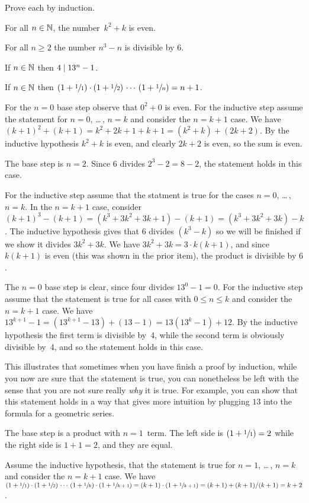 \documentclass{ibl}
\begin{document}
\begin{ex}
Prove each by induction.
\begin{exes}
\item For all $n\in\mathbb{N}$, the number~$k^2+k$ is even.
\item For all $n\geq 2$ the number $n^3-n$ is divisible by $6$.
\item If $n\in\mathbb{N}$ then $4\mid 13^n-1$.
\item If $n\in\mathbb{N}$ then
    $(1+\sfrac{1}{1})\cdot(1+\sfrac{1}{2})\,\cdots\,(1+\sfrac{1}{n})=n+1$.
\end{exes}
\begin{ans}
\begin{exes}
\item For the $n=0$ base step observe that $0^2+0$ is even.
  For the inductive step assume the statement for $n=0$, \ldots\,, $n=k$
  and consider the $n=k+1$ case.
  We have $(k+1)^2+(k+1)=k^2+2k+1+k+1=(k^2+k)+(2k+2)$. 
  By the inductive hypothesis $k^2+k$ is even, and clearly $2k+2$ is even, 
  so the sum is even.
\item The base step is $n=2$.
  Since $6$ divides $2^3-2=8-2$, the statement holds in this case.

  For the inductive step assume that the statment is true for 
  the cases $n=0$, \ldots\,, $n=k$.
  In the $n=k+1$ case, consider 
  $(k+1)^3-(k+1)=(k^3+3k^2+3k+1)-(k+1)=(k^3+3k^2+3k)-k$.
  The inductive hypothesis gives that $6$ divides $(k^3-k)$ so we will
  be finished if we show it divides  $3k^2+3k$.
  We have $3k^2+3k=3\cdot k(k+1)$, and since
  $k(k+1)$ is even (this was shown in the prior item),
  the product is divisible by $6$.  
\item The $n=0$ base step is clear, since four divides $13^0-1=0$.
  For the inductive step assume that the statement is true for all cases 
  with $0\leq n\leq k$ and consider the $n=k+1$ case.
  We have $13^{k+1}-1=(13^{k+1}-13)+(13-1)=13(13^k-1)+12$.
  By the inductive hypothesis the first term is divisible by~$4$, while the
  second term is obviously divisible by~$4$, and so the statement holds in 
  this case.

  \remark
  This illustrates that 
  sometimes when you have finish a proof by induction, 
  while you now are sure that the statement is true, 
  you can nonetheless be left with the sense
  that you are not sure really \emph{why} it is true.
  For example, you can show that this statement holds in a 
  way that gives more intuition by plugging $13$ into the formula for a
  geometric series. 
\item The base step is a product with $n=1$~term.
  The left side is $(1+\sfrac{1}{1})=2$ while the right side is $1+1=2$,
  and they are equal.

  Assume the inductive hypothesis, that the statement is true for
  $n=1$, \ldots\,, $n=k$ and consider the $n=k+1$ case.
  We have
  $(1+\sfrac{1}{1})\cdot(1+\sfrac{1}{2})\,\cdots\,(1+\sfrac{1}{k})\cdot(1+\sfrac{1}{k+1})
  =
  (k+1)\cdot(1+\sfrac{1}{k+1})
  =(k+1)+(k+1)/(k+1)
  =k+2$.
\end{exes}
\end{ans}
\end{ex}
\end{document}
